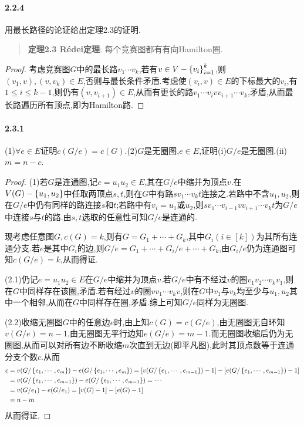 \documentclass[11pt]{article}
\begin{document}
\paragraph{2.2.4}用最长路径的论证给出定理2.3的证明.
\begin{quote}
    \textbf{定理2.3 R\'edei定理}: 每个竞赛图都有有向Hamilton圈.
\end{quote}
\begin{proof}
考虑竞赛图$G$中的最长路$v_1\cdots v_k$,若有$v\in V-\left\{v_i\right\}_{i=1}^k$,则$(v_1,v),(v,v_k)\in E$,否则与最长条件矛盾.考虑使$(v_i,v)\in E$的下标最大的$v_i$,有$1\leq i\leq k-1$,则仍有$(v,v_{i+1})\in E$,从而有更长的路$v_1\cdots v_i v v_{i+1}\cdots v_k$,矛盾,从而最长路遍历所有顶点,即为Hamilton路.
\end{proof}

\paragraph{2.3.1}(1)$\forall e\in E$证明$c(G/e)=c(G)$.(2)$G$是无圈图,$e\in E$,证明(i)$G/e$是无圈图.(ii)$m=n-c$.
\begin{proof}
(1)若$G$是连通图,记$e=u_1 u_2\in E$,其在$G/e$中缩并为顶点$v$.在$V(G)-\left\{u_1,u_2\right\}$中任取两顶点$s,t$,则在$G$中有路$sv_1\cdots v_k t$连接之.若路中不含$u_1,u_2$,则在$G/e$中仍有同样的路连接$s$和$t$;若路中有$v_i=u_1$或$u_2$,则$sv_1\cdots v_{i-1}vv_{i+1}\cdots v_k t$为$G/e$中连接$s$与$t$的路.由$s,t$选取的任意性可知$G/e$是连通的.

现考虑任意图$G,c(G)=k$,则有$G=G_1+\cdots +G_k$,其中$G_i(i\in [k])$为其所有连通分支.若$e$是其中$G_i$的边,则$G/e=G_1+\cdots +G_i/e+\cdots +G_k$,由$G_i/e$仍为连通图可知$c(G/e)=k$,从而得证.

(2.1)仍记$e=u_1 u_2\in E$在$G/e$中缩并为顶点$v$.若$G/e$中有不经过$v$的圈$v_1v_2\cdots v_kv_1$,则在$G$中同样存在该圈,矛盾.若有经过$v$的圈$vv_1\cdots v_k v$,则在$G$中$v_1$与$v_k$均至少与$u_1,u_2$其中一个相邻,从而在$G$中同样存在圈,矛盾.综上可知$G/e$同样为无圈图.

(2.2)收缩无圈图$G$中的任意边$e$时,由上知$c(G)=c(G/e)$,由无圈图无自环知$v(G/e)=n-1$,由无圈图无平行边知$e(G/e)=m-1$.而无圈图收缩后仍为无圈图,从而可以对所有边不断收缩$m$次直到无边(即平凡图),此时其顶点数等于连通分支个数$c$.从而
$$\begin{aligned}
        c & =v(G/\left\{e_1,\cdots,e_m\right\})-e(G/\left\{e_1,\cdots,e_m\right\})=[v(G/\left\{e_1,\cdots,e_{m-1}\right\})-1]-[e(G/\left\{e_1,\cdots,e_{m-1}\right\})-1] \\
          & =v(G/\left\{e_1,\cdots,e_{m-1}\right\})-e(G/\left\{e_1,\cdots,e_{m-1}\right\})=\cdots                                                      \\
          & =v(G/e_1)-e(G/e_1)=[v(G)-1]-[e(G)-1]                                                                                     \\
          & =n-m
    \end{aligned}$$
从而得证.
\end{proof}
\end{document}
